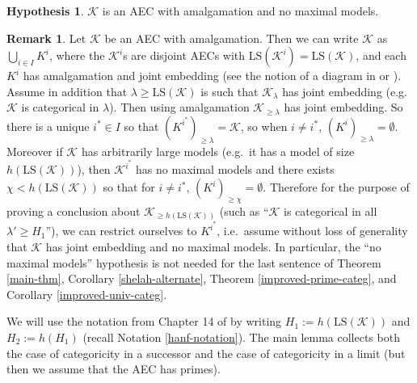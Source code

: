 \documentclass[12pt]{amsart}
\theoremstyle{definition}
\newtheorem{hypothesis}[mydef]{Hypothesis}
\newtheorem{remark}[mydef]{Remark}
\begin{document}
\begin{hypothesis}\label{ap-hyp}
  ${\mathcal{K}}$ is an AEC with amalgamation and no maximal models. 
\end{hypothesis}
\begin{remark}\label{nomax-rmk}
  Let ${\mathcal{K}}$ be an AEC with amalgamation. Then we can write ${\mathcal{K}}$ as $\bigcup_{i \in I} K^i$, where the ${\mathcal{K}}^i$s are disjoint AECs with ${\text{LS}} ({\mathcal{K}}^i) = {\text{LS}} ({\mathcal{K}})$, and each $K^i$ has amalgamation and joint embedding (see the notion of a diagram in \cite[Definition I.2.2]{shelahaecbook} or \cite[Lemma 16.14]{baldwinbook09}). Assume in addition that $\lambda \ge {\text{LS}} ({\mathcal{K}})$ is such that ${\mathcal{K}}_\lambda$ has joint embedding (e.g.\ ${\mathcal{K}}$ is categorical in $\lambda$). Then using amalgamation ${\mathcal{K}}_{\ge \lambda}$ has joint embedding. So there is a unique $i^\ast \in I$ so that $(K^{i^\ast})_{\ge \lambda} = {\mathcal{K}}$, so when $i \neq i^\ast$, $(K^i)_{\ge \lambda} = \emptyset$. Moreover if ${\mathcal{K}}$ has arbitrarily large models (e.g.\ it has a model of size ${h ({{\text{LS}} ({\mathcal{K}})})}$), then ${\mathcal{K}}^{i^\ast}$ has no maximal models and there exists $\chi < {h ({{\text{LS}} ({\mathcal{K}})})}$ so that for $i \neq i^\ast$, $(K^i)_{\ge \chi} = \emptyset$. Therefore for the purpose of proving a conclusion about ${\mathcal{K}}_{\ge {h ({{\text{LS}} ({\mathcal{K}})})}}$ (such as ``${\mathcal{K}}$ is categorical in all $\lambda' \ge H_1$''), we can restrict ourselves to $K^{i^\ast}$, i.e.\ assume without loss of generality that ${\mathcal{K}}$ has joint embedding and no maximal models. In particular, the ``no maximal models'' hypothesis is not needed for the last sentence of Theorem \ref{main-thm}, Corollary \ref{shelah-alternate}, Theorem \ref{improved-prime-categ}, and Corollary \ref{improved-univ-categ}.
\end{remark}

We will use the notation from Chapter 14 of \cite{baldwinbook09} by writing $H_1 := {h ({{\text{LS}} ({\mathcal{K}})})}$ and $H_2 := {h ({H_1})}$ (recall Notation \ref{hanf-notation}). The main lemma collects both the case of categoricity in a successor and the case of categoricity in a limit (but then we assume that the AEC has primes).
\end{document}

